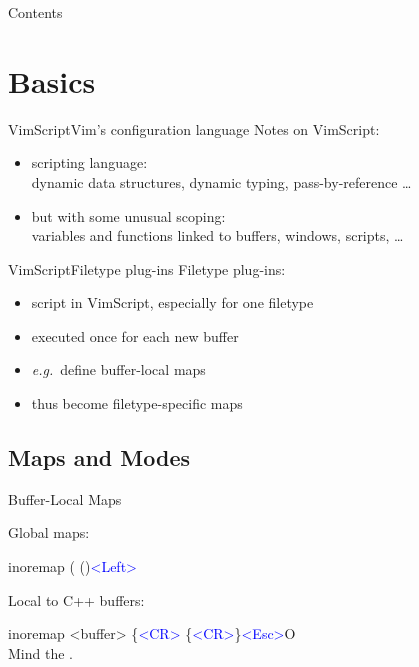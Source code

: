 \documentclass{beamer}
\newenvironment{mycode}[0]
{\ttfamily}
{}
\newcommand{\myctrlkey}[1]{\textcolor{blue}{#1}}
\begin{document}
\begin{frame}{Contents}{}
	\tableofcontents
\end{frame}


\section{Basics}

\begin{frame}{VimScript}{Vim's configuration language}
	Notes on VimScript:
	\begin{itemize}
		\item scripting language: \\
			dynamic data structures, dynamic typing, pass-by-reference \dots
		\item but with some unusual scoping: \\
			variables and functions linked to buffers, windows, scripts, \dots
	\end{itemize}
\end{frame}

\begin{frame}{VimScript}{Filetype plug-ins}
	Filetype plug-ins:
	\begin{itemize}
		\item<1-> script in VimScript, especially for one filetype
		\item<1-> executed once for each new buffer
		\item<2-> \textit{e.g.}\ define buffer-local maps
		\item<2-> thus become filetype-specific maps
	\end{itemize}
\end{frame}

\subsection{Maps and Modes}

\begin{frame}{Buffer-Local Maps}{}

	Global maps:
	\vspace{2mm}

	\begin{mycode}
		inoremap  (  ()\myctrlkey{<Left>} \\[2mm]
	\end{mycode}

	\vspace{5mm}

	Local to C++ buffers:
	\vspace{2mm}

	\begin{mycode}
		inoremap  <buffer>  \{\myctrlkey{<CR>}  \{\myctrlkey{<CR>}\}\myctrlkey{<Esc>}O
	\end{mycode} \\

	\vspace{5mm}
	Mind the .

\end{frame}
\end{document}
